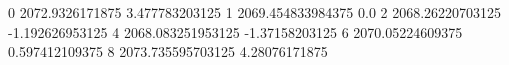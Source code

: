 0 2072.9326171875 3.477783203125
1 2069.454833984375 0.0
2 2068.26220703125 -1.192626953125
4 2068.083251953125 -1.37158203125
6 2070.05224609375 0.597412109375
8 2073.735595703125 4.28076171875

